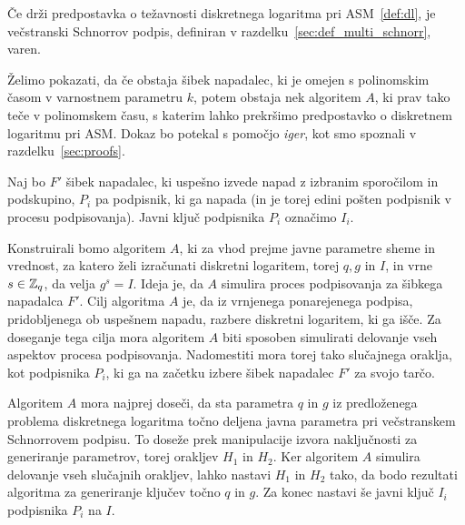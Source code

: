 \begin{izrek}
    Če drži predpostavka o težavnosti diskretnega logaritma pri ASM~\ref{def:dl}, je večstranski 
    Schnorrov podpis, definiran v razdelku~\ref{sec:def_multi_schnorr}, varen.
\end{izrek}

\begin{dokaz}
Želimo pokazati, da če obstaja šibek napadalec, ki je omejen s polinomskim časom v varnostnem parametru
$k$, potem obstaja nek algoritem $A$, ki prav tako teče v polinomskem času, s katerim lahko prekršimo
predpostavko o diskretnem logaritmu pri ASM. Dokaz bo potekal s pomočjo \textit{iger}, kot smo spoznali
v razdelku~\ref{sec:proofs}.

Naj bo $F'$ šibek napadalec, ki uspešno izvede napad z izbranim sporočilom in podskupino, $P_i$ pa
podpisnik, ki ga napada (in je torej edini pošten podpisnik v procesu podpisovanja). Javni ključ
podpisnika $P_i$ označimo $I_i$.

Konstruirali bomo algoritem $A$, ki za vhod prejme javne parametre sheme in vrednost, za katero želi
izračunati diskretni logaritem, torej $q, g$ in $I$, in vrne $s \in \mathbb Z_q$, da velja $g^s = I$. Ideja
je, da $A$ simulira proces podpisovanja za šibkega napadalca $F'$. Cilj algoritma $A$ je, da iz
vrnjenega ponarejenega podpisa, pridobljenega ob uspešnem napadu, razbere diskretni logaritem, ki ga
išče. Za doseganje tega cilja mora algoritem $A$ biti sposoben simulirati delovanje vseh aspektov
procesa podpisovanja. Nadomestiti mora torej tako slučajnega oraklja, kot podpisnika $P_i$, ki ga
na začetku izbere šibek napadalec $F'$ za svojo tarčo.

Algoritem $A$ mora najprej doseči, da sta parametra $q$ in $g$ iz predloženega problema diskretnega
logaritma točno deljena javna parametra pri večstranskem Schnorrovem podpisu. To doseže prek
manipulacije izvora naključnosti za generiranje parametrov, torej orakljev $H_1$ in $H_2$. Ker
algoritem $A$ simulira delovanje vseh slučajnih orakljev, lahko nastavi $H_1$ in $H_2$ tako, da
bodo rezultati algoritma za generiranje ključev točno $q$ in $g$. Za konec nastavi še javni ključ
$I_i$ podpisnika $P_i$ na $I$.


\end{dokaz}
